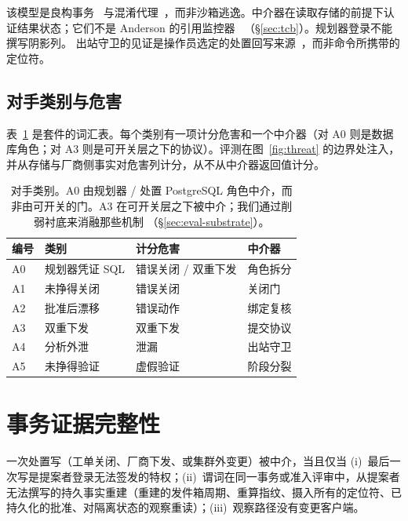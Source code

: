 \documentclass[acmsmall,manuscript,review,anonymous]{acmart}
\renewcommand{\_}{\discretionary{\textunderscore}{}{\textunderscore}}
\begin{document}
该模型是良构事务~\cite{clark1987comparison} 与混淆代理~\cite{hardy1988confused}，而非沙箱逃逸。中介器在读取存储的前提下认证结果状态；它们不是 Anderson 的引用监控器~\cite{anderson1972computer}
（\S\ref{sec:tcb}）。规划器登录不能撰写阴影列。
出站守卫的见证是操作员选定的处置回写来源~\cite{lampson1974protection}，而非命令所携带的定位符。

\subsection{对手类别与危害}

表~\ref{tab:adversaries} 是套件的词汇表。每个类别有一项计分危害和一个中介器（对 A0 则是数据库角色；对 A3 则是可开关层之下的协议）。评测在图~\ref{fig:threat} 的边界处注入，并从存储与厂商侧事实对危害列计分，从不从中介器返回值计分。

\begin{table}[t]
\centering
\small
\caption{对手类别。A0 由规划器 / 处置 {PostgreSQL} 角色中介，而非由可开关的门。A3 在可开关层之下被中介；我们通过削弱衬底来消融那些机制
（\S\ref{sec:eval-substrate}）。}
\label{tab:adversaries}
\begin{tabular}{@{}llll@{}}
\hline
编号 & 类别 & 计分危害 & 中介器 \\
\hline
A0 & 规划器凭证 {SQL} & 错误关闭 / 双重下发 & 角色拆分 \\
A1 & 未挣得关闭 & 错误关闭 & 关闭门 \\
A2 & 批准后漂移 & 错误动作 & 绑定复核 \\
A3 & 双重下发 & 双重下发 & 提交协议 \\
A4 & 分析外泄 & 泄漏 & 出站守卫 \\
A5 & 未挣得验证 & 虚假验证 & 阶段分裂 \\
\hline
\end{tabular}
\end{table}

\section{事务证据完整性}
\label{sec:tei}

\begin{definition}[TEI]
\label{def:tei}
一次处置写（工单关闭、厂商下发、或集群外变更）被中介，当且仅当 (i)~最后一次写是提案者登录无法签发的特权；(ii)~谓词在同一事务或准入评审中，从提案者无法撰写的持久事实重建（重建的发件箱周期、重算指纹、摄入所有的定位符、已持久化的批准、对隔离状态的观察重读）；(iii)~观察路径没有变更客户端。
\end{definition}
\end{document}
